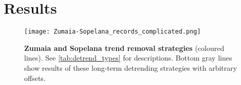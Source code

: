 \documentclass[draft]{agujournal2019}
\begin{document}


\section{Results}\label{sec:results}


\begin{figure}[htbp]
  \centering
  \texttt{[image: Zumaia-Sopelana\_records\_complicated.png]}
  \caption{\label{fig:detrend}
    \textbf{Zumaia and Sopelana trend removal strategies} (coloured lines).
    See \cref{tab:detrend_types} for descriptions.
    Bottom gray lines show results of these long-term detrending strategies with arbitrary offsets.}
\end{figure}
\end{document}

